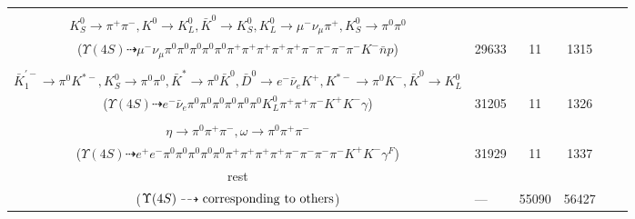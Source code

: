 \documentclass[landscape]{article}
\newcounter{rownumbers}
\newcommand\rn{\stepcounter{rownumbers}\arabic{rownumbers}}
\newcommand{\EOLP}{\\ \hline} %
\newcommand{\topoTags}[1]{#1} %
\begin{document}
\begin{longtable}{clcccc}
\rn & \makecell[l]{ $ 
\Upsilon(4S) \rightarrow B^{0} \bar{B}^{0} ,
B^{0} \rightarrow \pi^{+} \pi^{-} K^{0} \chi_{c1} ,
\bar{B}^{0} \rightarrow \pi^{+} K_{1}^{-} ,
K^{0} \rightarrow K_{S}^{0} ,
\chi_{c1} \rightarrow \pi^{0} \pi^{0} \pi^{0} \pi^{-} K^{0} \bar{K}^{0} \bar{n} p ,
K_{1}^{-} \rightarrow \pi^{+} \pi^{-} K^{-} ,
$ \\ $
K_{S}^{0} \rightarrow \pi^{+} \pi^{-} ,
K^{0} \rightarrow K_{L}^{0} ,
\bar{K}^{0} \rightarrow K_{S}^{0} ,
K_{L}^{0} \rightarrow \mu^{-} \nu_{\mu} \pi^{+} ,
K_{S}^{0} \rightarrow \pi^{0} \pi^{0} 
$ \\ ($
\Upsilon(4S) \dashrightarrow \mu^{-} \nu_{\mu} \pi^{0} \pi^{0} \pi^{0} \pi^{0} \pi^{0} \pi^{+} \pi^{+} \pi^{+} \pi^{+} \pi^{+} \pi^{-} \pi^{-} \pi^{-} \pi^{-} K^{-} \bar{n} p 
$) } & \topoTags{29633 & }11 & 1315 \EOLP

\rn & \makecell[l]{ $ 
\Upsilon(4S) \rightarrow B^{0} \bar{B}^{0} ,
B^{0} \rightarrow \pi^{-} K^{0} D^{+} \bar{D}^{*0} ,
\bar{B}^{0} \rightarrow \pi^{+} \bar{K}_1^{\prime-} ,
K^{0} \rightarrow K_{S}^{0} ,
D^{+} \rightarrow \pi^{0} \pi^{+} \bar{K}^{*} ,
\bar{D}^{*0} \rightarrow \bar{D}^{0} \gamma ,
$ \\ $
\bar{K}_1^{\prime-} \rightarrow \pi^{0} K^{*-} ,
K_{S}^{0} \rightarrow \pi^{0} \pi^{0} ,
\bar{K}^{*} \rightarrow \pi^{0} \bar{K}^{0} ,
\bar{D}^{0} \rightarrow e^{-} \bar{\nu}_{e} K^{+} ,
K^{*-} \rightarrow \pi^{0} K^{-} ,
\bar{K}^{0} \rightarrow K_{L}^{0} 
$ \\ ($
\Upsilon(4S) \dashrightarrow e^{-} \bar{\nu}_{e} \pi^{0} \pi^{0} \pi^{0} \pi^{0} \pi^{0} \pi^{0} K_{L}^{0} \pi^{+} \pi^{+} \pi^{-} K^{+} K^{-} \gamma 
$) } & \topoTags{31205 & }11 & 1326 \EOLP

\rn & \makecell[l]{ $ 
\Upsilon(4S) \rightarrow B^{0} \bar{B}^{0} ,
B^{0} \rightarrow \pi^{-} K^{+} \chi_{c1} ,
\bar{B}^{0} \rightarrow \pi^{+} K^{*-} ,
\chi_{c1} \rightarrow \pi^{0} \pi^{0} \pi^{+} \pi^{-} \eta \eta \omega ,
K^{*-} \rightarrow \pi^{0} K^{-} ,
\eta \rightarrow e^{+} e^{-} \gamma^{F} ,
$ \\ $
\eta \rightarrow \pi^{0} \pi^{+} \pi^{-} ,
\omega \rightarrow \pi^{0} \pi^{+} \pi^{-} 
$ \\ ($
\Upsilon(4S) \dashrightarrow e^{+} e^{-} \pi^{0} \pi^{0} \pi^{0} \pi^{0} \pi^{0} \pi^{+} \pi^{+} \pi^{+} \pi^{+} \pi^{-} \pi^{-} \pi^{-} \pi^{-} K^{+} K^{-} \gamma^{F} 
$) } & \topoTags{31929 & }11 & 1337 \EOLP

rest & \makecell[l]{ $ 
\Upsilon(4S) \rightarrow \rm{others \  (41864 \  in \  total)}
$ \\ ($
\Upsilon(4S) \dashrightarrow \rm{corresponding\ to\ others}
$) } & \topoTags{--- & }55090 & 56427 \\ \hline

\end{longtable}
\end{document}
